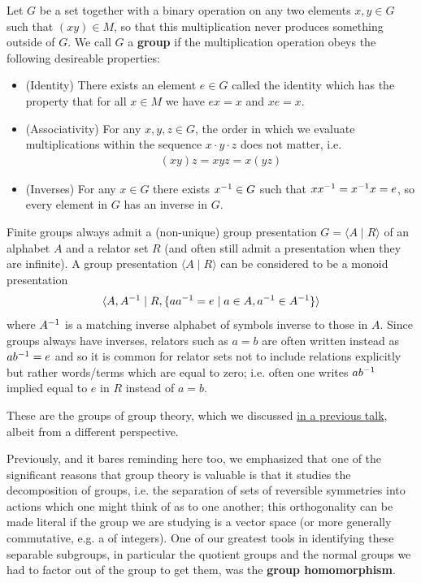 \documentclass[11pt]{article}
\begin{document}
\begin{definition}[Groups]
Let $G$ be a set together with a binary  operation on any two elements $x,y \in G$ such that $(xy) \in M$, so that this multiplication never produces something outside of $G$. We call $G$ a \textbf{group} if the multiplication operation obeys the following desireable properties: \begin{itemize}
\item (Identity) There exists an element $e\in G$ called the identity which has the property that for all $x \in M$ we have $ex = x$ and $xe = x$.
\item (Associativity) For any $x,y,z \in G$, the order in which we evaluate multiplications within the sequence $x\cdot y \cdot z$ does not matter, i.e. \begin{gather*}
(xy)z = xyz = x(yz)
\end{gather*}
\item (Inverses) For any $x \in G$ there exists $x^{-1} \in G$ such that $x x^{-1} = x^{-1} x = e$, so every element in $G$ has an inverse in $G$.
\end{itemize}
Finite groups always admit a (non-unique) group presentation $G = \langle A \mid R \rangle$ of an alphabet $A$ and a relator set $R$ (and often still admit a presentation when they are infinite). A group presentation $\langle A \mid R \rangle$ can be considered to be a monoid presentation \begin{gather*}
\langle A, A^{-1} \mid R, \{ a a^{-1} = e \mid a \in A, a^{-1} \in A^{-1} \} \rangle
\end{gather*}
where $A^{-1}$ is a matching inverse alphabet of symbols inverse to those in $A$. Since groups always have inverses, relators such as $a = b$ are often written instead as $ab^{-1} = e$ and so it is common for relator sets not to include relations explicitly but rather words/terms which are equal to zero; i.e. often one writes $a b^{-1}$ implied equal to $e$ in $R$ instead of $a = b$.
\end{definition}

These are the groups of group theory, which we discussed \hyperlink{https://clockssugars.blog/articles/0326-matrixgroups/}{in a previous talk}, albeit from a different perspective.

Previously, and it bares reminding here too, we emphasized that one of the significant reasons that group theory is valuable is that it studies the decomposition of groups, i.e. the separation of sets of reversible symmetries into actions which one might think of as  to one another; this orthogonality can be made literal if the group we are studying is a vector space (or more generally commutative, e.g. a  of integers). One of our greatest tools in identifying these separable subgroups, in particular the quotient groups and the normal groups we had to factor out of the group to get them, was the \textbf{group homomorphism}.
\end{document}
